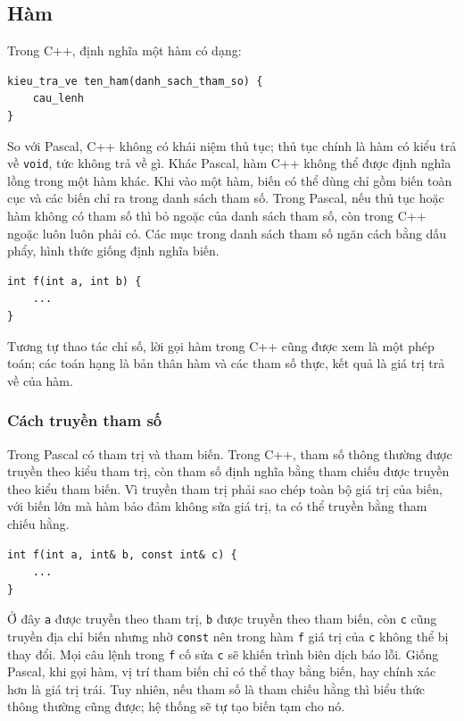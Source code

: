 \documentclass[11pt]{article}
\newcommand{\cpp}{C++}
\newcommand{\pascal}{Pascal}
\begin{document}
\subsection{Hàm}

Trong \cpp{}, định nghĩa một hàm có dạng:

\begin{verbatim}
kieu_tra_ve ten_ham(danh_sach_tham_so) {
    cau_lenh
}
\end{verbatim}

So với \pascal{}, \cpp{} không có khái niệm thủ tục; thủ tục chính là hàm có
kiểu trả về \verb|void|, tức không trả về gì. Khác \pascal{}, hàm \cpp{} không
thể được định nghĩa lồng trong một hàm khác. Khi vào một hàm, biến có thể dùng
chỉ gồm biến toàn cục và các biến chỉ ra trong danh sách tham số. Trong
\pascal{}, nếu thủ tục hoặc hàm không có tham số thì bỏ ngoặc của danh sách
tham số, còn trong \cpp{} ngoặc luôn luôn phải có. Các mục trong danh sách
tham số ngăn cách bằng dấu phẩy, hình thức giống định nghĩa biến.

\begin{verbatim}
int f(int a, int b) {
    ...
}
\end{verbatim}

Tương tự thao tác chỉ số, lời gọi hàm trong \cpp{} cũng được xem là một phép
toán; các toán hạng là bản thân hàm và các tham số thực, kết quả là giá trị
trả về của hàm.

\subsubsection*{Cách truyền tham số}

Trong \pascal{} có tham trị và tham biến. Trong \cpp{}, tham số thông thường
được truyền theo kiểu tham trị, còn tham số định nghĩa bằng tham chiếu được
truyền theo kiểu tham biến. Vì truyền tham trị phải sao chép toàn bộ giá trị
của biến, với biến lớn mà hàm bảo đảm không sửa giá trị, ta có thể truyền
bằng tham chiếu hằng.

\begin{verbatim}
int f(int a, int& b, const int& c) {
    ...
}
\end{verbatim}

Ở đây \verb|a| được truyền theo tham trị, \verb|b| được truyền theo tham biến,
còn \verb|c| cũng truyền địa chỉ biến nhưng nhờ \verb|const| nên trong hàm
\verb|f| giá trị của \verb|c| không thể bị thay đổi. Mọi câu lệnh trong
\verb|f| cố sửa \verb|c| sẽ khiến trình biên dịch báo lỗi. Giống \pascal{},
khi gọi hàm, vị trí tham biến chỉ có thể thay bằng biến, hay chính xác hơn là
giá trị trái. Tuy nhiên, nếu tham số là tham chiếu hằng thì biểu thức thông
thường cũng được; hệ thống sẽ tự tạo biến tạm cho nó.
\end{document}
